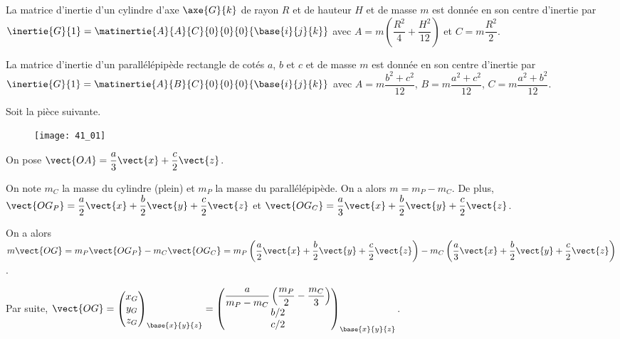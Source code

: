 \normaltrue \difficilefalse \tdifficilefalse
\correctiontrue


\setcounter{question}{0}
\ifcorrection
\else
{}
\fi

\ifprof
\else
La matrice d'inertie d'un cylindre d'axe $\axe{G}{k}$ de rayon $R$ et de hauteur $H$ et de masse $m$ est donnée en son centre d'inertie par 
$\inertie{G}{1}=\matinertie{A}{A}{C}{0}{0}{0}{\base{i}{j}{k}}$ avec $A=m\left(\dfrac{R^2}{4}+\dfrac{H^2}{12} \right)$ et $C=m\dfrac{R^2}{2}$. 


La matrice d'inertie d'un parallélépipède rectangle de cotés $a$, $b$ et $c$ et de masse $m$ est donnée en son centre d'inertie par 
$\inertie{G}{1}=\matinertie{A}{B}{C}{0}{0}{0}{\base{i}{j}{k}}$ avec $A={m\dfrac{b^2+c^2}{12}}$, $B={m\dfrac{a^2+c^2}{12}}$, $C={m\dfrac{a^2+b^2}{12}}$.

Soit la pièce suivante. 
\begin{figure}[H]
\centering
\texttt{[image: 41\_01]}
\end{figure}

On pose $\vect{OA}=\dfrac{a}{3}\vect{x}+\dfrac{c}{2}\vect{z}$. 

\fi



\ifprof
On note $m_C$ la masse du cylindre (plein) et $m_P$ la masse du parallélépipède. On a alors $m=m_P-m_C$.
De plus, $\vect{OG_P}=\dfrac{a}{2}\vect{x}+\dfrac{b}{2}\vect{y}+\dfrac{c}{2}\vect{z}$
et $\vect{OG_C}=\dfrac{a}{3}\vect{x}+\dfrac{b}{2}\vect{y}+\dfrac{c}{2}\vect{z}$.

On a alors 
$m \vect{OG}=m_P \vect{OG_P}-m_C \vect{OG_C} = m_P \left(\dfrac{a}{2}\vect{x}+\dfrac{b}{2}\vect{y}+\dfrac{c}{2}\vect{z} \right)-m_C \left( \dfrac{a}{3}\vect{x}+\dfrac{b}{2}\vect{y}+\dfrac{c}{2}\vect{z}\right) $.

Par suite, 
$\vect{OG}=
\begin{pmatrix}
x_G \\ y_G \\ z_G
\end{pmatrix}_{\base{x}{y}{z}}
=
\begin{pmatrix}
\dfrac{a}{m_P-m_C} \left( \dfrac{m_P}{2} -  \dfrac{m_C}{3}\right) \\
b/2 \\
c/2
\end{pmatrix}_{\base{x}{y}{z}}
$.
\else
\fi

